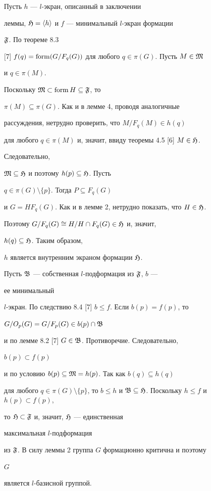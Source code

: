 \begin{pf} 


Пусть $h$ --- $l$-экран, описанный в заключении 


леммы, $\frak H=\langle h\rangle$ и $f$ --- минимальный $l$-экран формации 


$\frak F$. По теореме 8.3 


[7] $f(q)=\operatorname{form}(G/F_q(G))$ для любого $q\in\pi(G)$. Пусть $M\in\frak M$ 


и $q\in\pi(M)$. 


Поскольку $\frak M\subset\operatorname{form} H\subseteq\frak F$, то 


$\pi(M)\subseteq\pi(G)$. Как и в лемме 4, проводя аналогичные 


рассуждения, нетрудно проверить, что $M/F_q(M)\in h(q)$ 


для любого $q\in\pi(M)$ и, значит, ввиду теоремы 4.5 [6] $M\in\frak H$. 


Следовательно, 


$\frak M\subseteq\frak H$ и поэтому $h(p)\subseteq\frak H$. Пусть 


$q\in\pi(G)\setminus\{p\}$. Тогда $P\subseteq F_q(G)$ 


и $G=H F_q(G)$. Как и в лемме 2, нетрудно показать, что $H\in\frak H$. 


Поэтому $G/F_q(G)\cong H/H\cap F_q(G)\in\frak H$ и, значит, 


$h(q)\subseteq\frak H$. Таким образом, 


$h$ является внутренним экраном формации $\frak H$. 


 


Пусть $\frak B$ --- собственная $l$-подформация из $\frak F$, $b$ --- 


ее минимальный 


$l$-экран. По следствию 8.4 [7] $b\le f$. Если $b(p)=f(p)$, то 


$G/O_p(G)=G/F_p(G)\in b(p)\cap\frak B$ 


и по лемме 8.2 [7] $G\in\frak B$. Противоречие. Следовательно, 


$b(p)\subset f(p)$ 


и по условию $b(p)\subseteq\frak M=h(p)$. Так как $b(q)\subseteq h(q)$ 


для любого $q\in\pi(G)\setminus\{p\}$, то $b\le h$ и $\frak 


B\subseteq\frak H$. Поскольку $h\le f$ и $h(p)\subset f(p)$, 


то $\frak H\subset\frak F$ и, значит, $\frak H$ --- единственная 


максимальная $l$-подформация 


из $\frak F$. В силу леммы 2 группа $G$ формационно критична и поэтому 


$G$ 


является $l$-базисной группой. 


\end{pf} 


